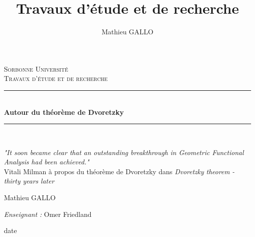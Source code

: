 \documentclass[12pt]{article}
\author{Mathieu GALLO}
\title{Travaux d'étude et de recherche}
\theoremstyle{definition}
\newcommand{\HRule}{\rule{\linewidth}{0.5mm}}
\begin{document}
\begin{titlepage}
	\begin{center}
		
		\textsc{\LARGE Sorbonne Université}\\[2cm]
		
		\textsc{\Large Travaux d'étude et de recherche}\\[1.5cm]
		

		\HRule \\[0.4cm]
		{ \huge \bfseries Autour du théorème de Dvoretzky\\[0.4cm] }
		

		\HRule \\[2cm]
		
		\vspace{1cm}
		\begin{center}
			\textit{"It soon became clear that an outstanding breakthrough in Geometric Functional Analysis had been achieved."}  \\
			\footnotesize Vitali Milman à propos du théorème de Dvoretzky dans \textit{Dvoretzky theorem - thirty years later}
		\end{center}

		
		\vfill 
		
		\begin{minipage}{0.4\textwidth}
			\begin{flushleft} 
				Mathieu GALLO \\
			\end{flushleft}
		\end{minipage}
		\begin{minipage}{0.4\textwidth}
			\begin{flushright} 
				\emph{Enseignant :} Omer Friedland\\
			\end{flushright}
		\end{minipage}
		
		\vspace{5mm}		
		{ date}
		
	\end{center}
\end{titlepage}

\tableofcontents\newpage
\end{document}
